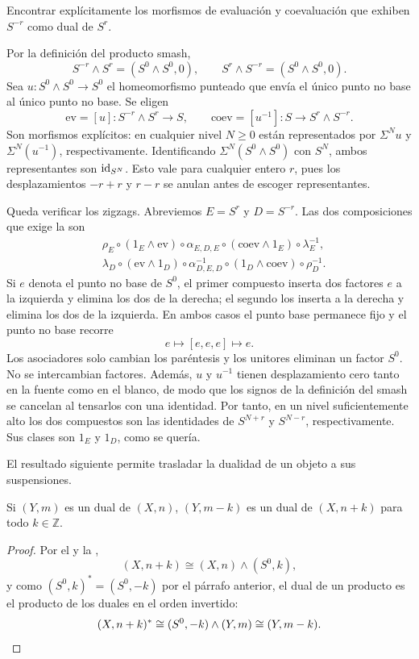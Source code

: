 \begin{ejer}
Encontrar explícitamente los morfismos de evaluación y coevaluación que exhiben $S^{-r}$ como dual de $S^r$.
\end{ejer}
\begin{sol}
Por la definición del producto smash,
\[
S^{-r}\wedge S^r=(S^0\wedge S^0,0),
\qquad
S^r\wedge S^{-r}=(S^0\wedge S^0,0).
\]
Sea $u\colon S^0\wedge S^0\to S^0$ el homeomorfismo punteado que envía el único punto no base al único punto no base. Se eligen
\[
\mathrm{ev}=[u]\colon S^{-r}\wedge S^r\longrightarrow S,
\qquad
\mathrm{coev}=[u^{-1}]\colon S\longrightarrow S^r\wedge S^{-r}.
\]
Son morfismos explícitos: en cualquier nivel $N\geq0$ están representados por $\Sigma^N u$ y $\Sigma^N(u^{-1})$, respectivamente. Identificando $\Sigma^N(S^0\wedge S^0)$ con $S^N$, ambos representantes son $\operatorname{id}_{S^N}$. Esto vale para cualquier entero $r$, pues los desplazamientos $-r+r$ y $r-r$ se anulan antes de escoger representantes.

Queda verificar los zigzags. Abreviemos $E=S^r$ y $D=S^{-r}$. Las dos composiciones que exige la  son
\[
\begin{aligned}
&\rho_E\circ(1_E\wedge\mathrm{ev})\circ\alpha_{E,D,E}
\circ(\mathrm{coev}\wedge1_E)\circ\lambda_E^{-1},\\
&\lambda_D\circ(\mathrm{ev}\wedge1_D)\circ\alpha^{-1}_{D,E,D}
\circ(1_D\wedge\mathrm{coev})\circ\rho_D^{-1}.
\end{aligned}
\]
Si $e$ denota el punto no base de $S^0$, el primer compuesto inserta dos factores $e$ a la izquierda y elimina los dos de la derecha; el segundo los inserta a la derecha y elimina los dos de la izquierda. En ambos casos el punto base permanece fijo y el punto no base recorre
\[
e\longmapsto[e,e,e]\longmapsto e.
\]
Los asociadores solo cambian los paréntesis y los unitores eliminan un factor $S^0$. No se intercambian factores. Además, $u$ y $u^{-1}$ tienen desplazamiento cero tanto en la fuente como en el blanco, de modo que los signos de la definición del smash se cancelan al tensarlos con una identidad. Por tanto, en un nivel suficientemente alto los dos compuestos son las identidades de $S^{N+r}$ y $S^{N-r}$, respectivamente. Sus clases son $1_E$ y $1_D$, como se quería.
\end{sol}

El resultado siguiente permite trasladar la dualidad de un objeto a sus suspensiones.

\begin{lema}\label{lema:suspension-dual}
Si $(Y,m)$ es un dual de $(X,n)$, $(Y,m-k)$ es un dual de $(X,n+k)$ para todo $k\in\mathbb Z$.
\end{lema}
\begin{proof}
Por el  y la ,
\[
(X,n+k)\cong(X,n)\wedge(S^0,k),
\]
y como $(S^0,k)^*=(S^0,-k)$ por el párrafo anterior, el dual de un producto es el producto de los duales en el orden invertido:
\[
(X,n+k)^*\cong(S^0,-k)\wedge(Y,m)\cong(Y,m-k). \qedhere
\]
\end{proof}

